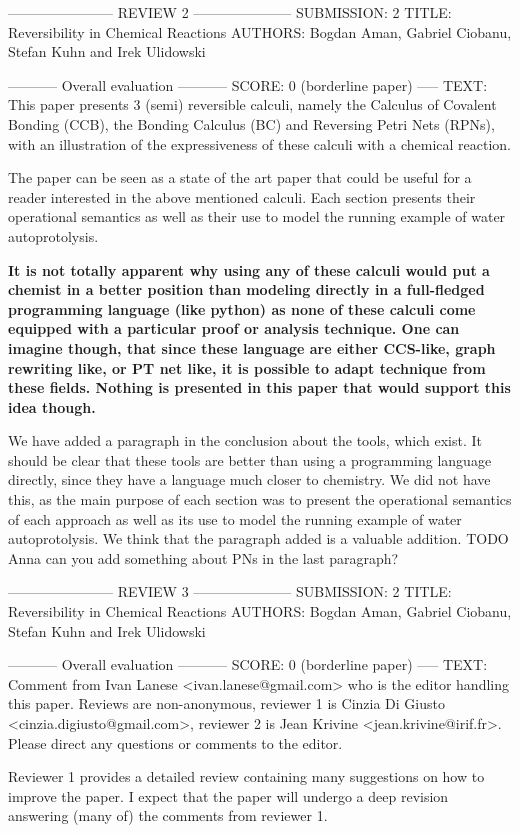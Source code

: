 \documentclass{article}
\begin{document}
----------------------- REVIEW 2 ---------------------
SUBMISSION: 2
TITLE: Reversibility in Chemical Reactions
AUTHORS: Bogdan Aman, Gabriel Ciobanu, Stefan Kuhn and Irek Ulidowski

----------- Overall evaluation -----------
SCORE: 0 (borderline paper)
----- TEXT:
This paper presents 3 (semi) reversible calculi, namely the Calculus of Covalent Bonding (CCB), the Bonding Calculus (BC) and Reversing Petri Nets (RPNs), with an illustration of the expressiveness of these calculi with a chemical reaction.

The paper can be seen as a state of the art paper that could be useful for a reader interested in the above mentioned calculi. Each section presents their operational semantics as well as their use to model the running example of water autoprotolysis.

\textbf{It is not totally apparent why using any of these calculi would put a chemist in a better position than modeling directly in a full-fledged programming language (like python) as none of these calculi come equipped with a particular proof or analysis technique.  One can imagine though, that since these language are either CCS-like, graph rewriting like, or PT net like, it is possible to adapt technique from these fields. Nothing is presented in this paper that would support this idea though.}

We have added a paragraph in the conclusion about the tools, which exist. It should be clear that these tools are better than using a programming language directly, since they have a language much closer to chemistry. We did not have this, as the main purpose of each section was to present the operational semantics of each approach as well as its use to model the running example of water autoprotolysis. We think that the paragraph added is a valuable addition. TODO Anna can you add something about PNs in the last paragraph?

----------------------- REVIEW 3 ---------------------
SUBMISSION: 2
TITLE: Reversibility in Chemical Reactions
AUTHORS: Bogdan Aman, Gabriel Ciobanu, Stefan Kuhn and Irek Ulidowski

----------- Overall evaluation -----------
SCORE: 0 (borderline paper)
----- TEXT:
Comment from Ivan Lanese <ivan.lanese@gmail.com> who is the editor handling this paper. Reviews are non-anonymous, reviewer 1 is Cinzia Di Giusto <cinzia.digiusto@gmail.com>, reviewer 2 is Jean Krivine <jean.krivine@irif.fr>. Please direct any questions or comments to the editor.

Reviewer 1 provides a detailed review containing many suggestions on how to improve the paper. I expect that the paper will undergo a deep revision answering (many of) the comments from reviewer 1.
\end{document}
